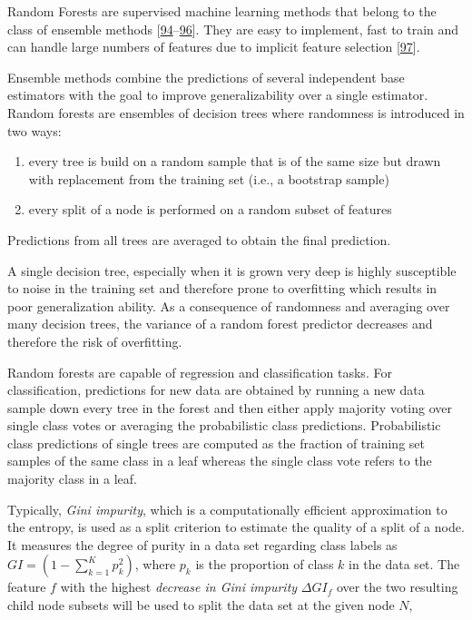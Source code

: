 \documentclass[12pt,a4paper,twoside]{book}
\providecommand{\tightlist}{%
  \setlength{\itemsep}{0pt}\setlength{\parskip}{0pt}}
\theoremstyle{definition}
\theoremstyle{definition}
\theoremstyle{remark}
\begin{document}
Random Forests are supervised machine learning methods that belong to
the class of ensemble methods
{[}\protect\hyperlink{ref-Ho1998}{94}--\protect\hyperlink{ref-Breiman2001}{96}{]}.
They are easy to implement, fast to train and can handle large numbers
of features due to implicit feature selection
{[}\protect\hyperlink{ref-Menze2009}{97}{]}.

Ensemble methods combine the predictions of several independent base
estimators with the goal to improve generalizability over a single
estimator. Random forests are ensembles of decision trees where
randomness is introduced in two ways:

\begin{enumerate}
\def\labelenumi{\arabic{enumi}.}
\tightlist
\item
  every tree is build on a random sample that is of the same size but
  drawn with replacement from the training set (i.e., a bootstrap
  sample)
\item
  every split of a node is performed on a random subset of features
\end{enumerate}

Predictions from all trees are averaged to obtain the final prediction.

A single decision tree, especially when it is grown very deep is highly
susceptible to noise in the training set and therefore prone to
overfitting which results in poor generalization ability. As a
consequence of randomness and averaging over many decision trees, the
variance of a random forest predictor decreases and therefore the risk
of overfitting.

Random forests are capable of regression and classification tasks. For
classification, predictions for new data are obtained by running a new
data sample down every tree in the forest and then either apply majority
voting over single class votes or averaging the probabilistic class
predictions. Probabilistic class predictions of single trees are
computed as the fraction of training set samples of the same class in a
leaf whereas the single class vote refers to the majority class in a
leaf.

Typically, \emph{Gini impurity}, which is a computationally efficient
approximation to the entropy, is used as a split criterion to estimate
the quality of a split of a node. It measures the degree of purity in a
data set regarding class labels as \(GI = (1 - \sum_{k=1}^K p_k^2)\),
where \(p_k\) is the proportion of class \(k\) in the data set. The
feature \(f\) with the highest \emph{decrease in Gini impurity}
\(\Delta GI_f\) over the two resulting child node subsets will be used
to split the data set at the given node \(N\),
\end{document}
